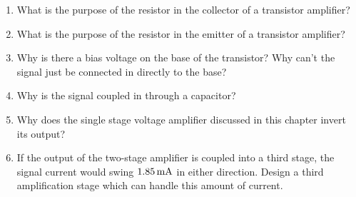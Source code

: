 \begin{enumerate}
\item What is the purpose of the resistor in the collector of a transistor amplifier?
\item What is the purpose of the resistor in the emitter of a transistor amplifier?
\item Why is there a bias voltage on the base of the transistor?  Why can't the signal just be connected in directly to the base?
\item Why is the signal coupled in through a capacitor?
\item Why does the single stage voltage amplifier discussed in this chapter invert its output?
\item If the output of the two-stage amplifier is coupled into a third stage, the signal current would swing $1.85\,\si{\milli\ampere}$ in either direction.  Design a third amplification stage which can handle this amount of current.
\end{enumerate}
